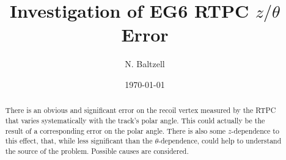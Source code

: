 \documentclass[amsmath,amssymb,notitlepage,11pt]{revtex4-1}
\begin{document}
\hspace*{11.5cm}

\title{Investigation of EG6 RTPC $z/\theta$ Error}
\author{N. Baltzell}
\date{\today}
\begin{abstract}
There is an obvious and significant error on the recoil vertex measured by the RTPC that varies systematically with the track's polar angle.  This could actually be the result of a corresponding error on the polar angle.  There is also some $z$-dependence to this effect, that, while less significant than the $\theta$-dependence, could help to understand the source of the problem.  Possible causes are considered.%
\end{abstract}
\maketitle
\tableofcontents
\end{document}
